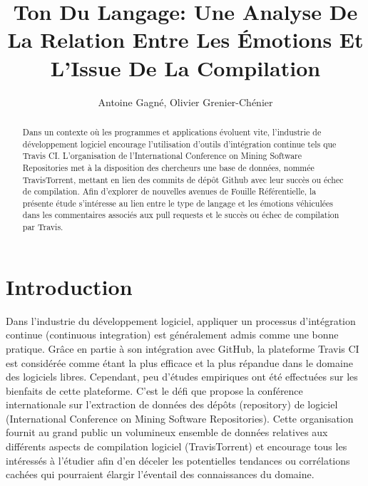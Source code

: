 \documentclass[10pt, conference]{IEEEtran}
\title{Ton Du Langage: Une Analyse De La Relation Entre Les Émotions Et L'Issue De La Compilation}
\author{Antoine Gagné, Olivier Grenier-Chénier}
\begin{document}
\maketitle

\begin{abstract}
Dans un contexte où les programmes et applications évoluent vite, l'industrie de développement logiciel encourage l'utilisation d'outils d'intégration continue tels que Travis CI. L'organisation de l'International Conference on Mining Software Repositories met à la disposition des chercheurs une base de données, nommée TravisTorrent, mettant en lien des commits de dépôt Github avec leur succès ou échec de compilation. Afin d'explorer de nouvelles avenues de Fouille Référentielle, la présente étude s'intéresse au lien entre le type de langage et les émotions véhiculées dans les commentaires associés aux pull requests et le succès ou échec de compilation par Travis.
\end{abstract}


\section{Introduction}
\label{sec:introduction}
Dans l’industrie du développement logiciel, appliquer un processus d’intégration continue (continuous integration) est généralement admis comme une bonne pratique. Grâce en partie à son intégration avec GitHub, la plateforme Travis CI est considérée comme étant la plus efficace et la plus répandue dans le domaine des logiciels libres. Cependant, peu d’études empiriques ont été effectuées sur les bienfaits de cette plateforme. C’est le défi que propose la conférence internationale sur l’extraction de données des dépôts (repository) de logiciel (International Conference on Mining Software Repositories). Cette organisation fournit au grand public un volumineux ensemble de données relatives aux différents aspects de compilation logiciel (TravisTorrent) et encourage tous les intéressés à l’étudier afin d’en déceler les potentielles tendances ou corrélations cachées qui pourraient élargir l’éventail des connaissances du domaine. 
\end{document}
